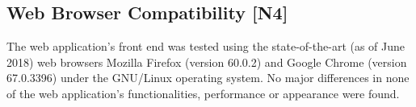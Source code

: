 \subsection{Web Browser Compatibility [N4]}
The web application's front end was tested using the state-of-the-art (as of June 2018) web browsers Mozilla Firefox (version 60.0.2) and Google Chrome (version 67.0.3396) under the GNU/Linux operating system. No major differences in none of the web application's functionalities, performance or appearance were found.
